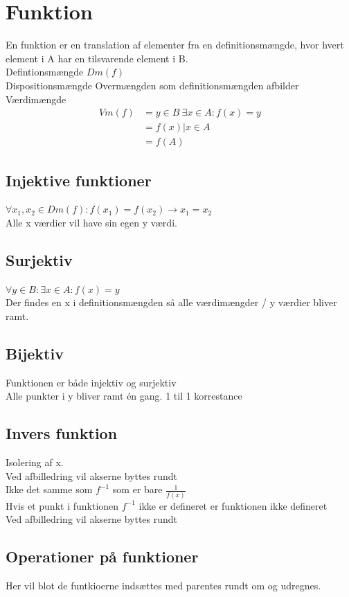 \documentclass[12pt, a4paper]{article}
\begin{document}
			\section{Funktion}
				En funktion er en translation af elementer fra en definitionsmængde, hvor hvert element i A har en tilsvarende element i B.\\
				Defintionsmængde $Dm(f)$\\
				Dispositionsmængde Overmængden som definitionsmængden afbilder\\
				Værdimængde 
				\begin{align*}
					Vm(f)&={y\in B \ \exists x \in A: f(x)=y}\\
						&={f(x)|x\in A}\\
						&=f(A)
				\end{align*}
				\subsection{Injektive funktioner}
					$\forall x_1,x_2 \in Dm(f): f(x_1)=f(x_2)\rightarrow x_1=x_2$\\
					Alle x værdier vil have sin egen y værdi.
				\subsection{Surjektiv}
					$\forall y \in B: \exists x \in A: f(x)=y$\\
					Der findes en x i definitionsmængden så alle værdimængder / y værdier bliver ramt.
				\subsection{Bijektiv}
					Funktionen er både injektiv og surjektiv\\
					Alle punkter i y bliver ramt én gang. 1 til 1 korrestance 
				\subsection{Invers funktion}
					Isolering af x.\\
					Ved afbilledring vil akserne byttes rundt\\
					Ikke det samme som $f^{-1}$ som er bare $\frac{1}{f(x)}$\\
					Hvis et punkt i funktionen $f^{-1}$ ikke er defineret er funktionen ikke defineret\\
					Ved afbilledring vil akserne byttes rundt
				\subsection{Operationer på funktioner}
					Her vil blot de funtkioerne indsættes med parentes rundt om og udregnes.
\end{document}
